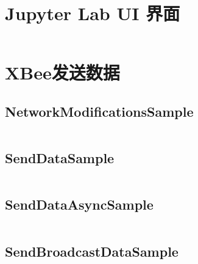 \section{Jupyter Lab UI 界面}
\label{sec:JupyterLabUI-Code}
\inputminted[mathescape, linenos, breaklines]{python3}{Code/UI.py}

\section{XBee发送数据}

\subsection{NetworkModificationsSample}
\label{sec:NetworkModificationsSample}
\inputminted[mathescape, linenos, breaklines]{python3}{Code/NetworkModificationsSample/NetworkModificationsSample.py}

\subsection{SendDataSample}
\label{sec:SendDataSample}
\inputminted[mathescape, linenos, breaklines]{python3}{Code/SendDataSample/SendDataSample.py}

\subsection{SendDataAsyncSample}
\label{sec:SendDataAsyncSample}
\inputminted[mathescape, linenos, breaklines]{python3}{Code/SendDataAsyncSample/SendDataAsyncSample.py}

\subsection{SendBroadcastDataSample}
\label{sec:SendBroadcastDataSample}
\inputminted[mathescape, linenos, breaklines]{python3}{Code/SendBroadcastDataSample/SendBroadcastDataSample.py}